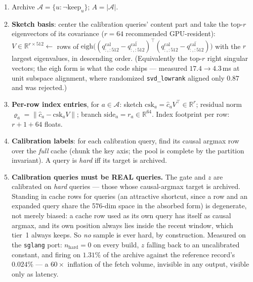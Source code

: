 \documentclass[11pt]{article}
\newcommand{\keep}{\mathrm{keep}}
\begin{document}
\begin{enumerate}[itemsep=1pt]
\item Archive $\mathcal{A} = \{u : \neg\keep_u\}$; $A = |\mathcal{A}|$.
\item \textbf{Sketch basis}: center the calibration queries' content part
and take the top-$r$ eigenvectors of its covariance
($r=64$ recommended GPU-resident):
$V \in \mathbb{R}^{r\times 512} \gets$ rows of
$\mathrm{eigh}\big((q^{\mathrm{cal}}_{:, :512}
- \overline{q^{\mathrm{cal}}_{:, :512}})^{\!\top}
(q^{\mathrm{cal}}_{:, :512} - \overline{q^{\mathrm{cal}}_{:, :512}})\big)$
with the $r$ largest eigenvalues, in descending order. (Equivalently the
top-$r$ right singular vectors; the eigh form is what the code ships ---
measured $17.4 \to 4.3$\,ms at unit subspace alignment, where randomized
\texttt{svd\_lowrank} aligned only $0.87$ and was rejected.)
\item \textbf{Per-row index entries}, for $a \in \mathcal{A}$:
sketch $\mathrm{csk}_a = \hat c_a V^{\!\top} \in \mathbb{R}^{r}$;
residual norm $\varrho_a = \lVert \hat c_a - \mathrm{csk}_a V\rVert$;
branch $\mathrm{side}_a = r_a \in \mathbb{R}^{64}$.
Index footprint per row: $r + 1 + 64$ floats.
\item \textbf{Calibration labels}: for each calibration query, find its
causal argmax row over the \emph{full} cache (chunk the key axis; the pool
is complete by the partition invariant). A query is \emph{hard} iff its
target is archived.
\item \textbf{Calibration queries must be REAL queries.} The gate and $z$
are calibrated on \emph{hard} queries --- those whose causal-argmax target is
archived. Standing in cache rows for queries (an attractive shortcut, since a
row and an expanded query share the 576-dim space in the absorbed form) is
degenerate, not merely biased: a cache row used as its own query has itself as
causal argmax, and its own position always lies inside the recent window, which
tier~1 always keeps. So \emph{no} sample is ever hard, by construction. Measured
on the \texttt{sglang} port: $n_{\mathrm{hard}}=0$ on every build, $z$ falling
back to an uncalibrated constant, and firing on $1.31\%$ of the archive against
the reference record's $0.024\%$ --- a $60{\times}$ inflation of the fetch
volume, invisible in any output, visible only as latency.


\end{enumerate}
\end{document}

